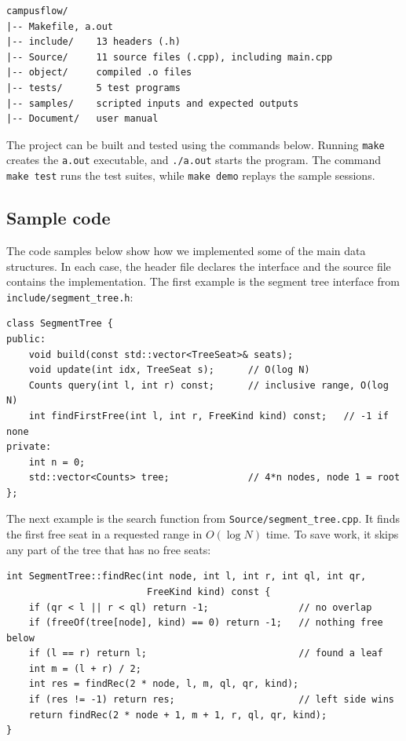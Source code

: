 \documentclass[11pt,a4paper]{article}
\newcommand{\code}[1]{\texttt{#1}}
\begin{document}
\begin{lstlisting}[language={}, caption={Directory layout of the submission.}]
campusflow/
|-- Makefile, a.out
|-- include/    13 headers (.h)
|-- Source/     11 source files (.cpp), including main.cpp
|-- object/     compiled .o files
|-- tests/      5 test programs
|-- samples/    scripted inputs and expected outputs
|-- Document/   user manual
\end{lstlisting}

The project can be built and tested using the commands below. Running
\code{make} creates the \code{a.out} executable, and \code{./a.out} starts the
program. The command \code{make test} runs the test suites, while
\code{make demo} replays the sample sessions.

\subsection{Sample code}
The code samples below show how we implemented some of the main data
structures. In each case, the header file declares the interface and the source
file contains the implementation. The first example is the segment tree
interface from \code{include/segment\_tree.h}:

\begin{lstlisting}[caption={Segment tree interface (excerpt).}]
class SegmentTree {
public:
    void build(const std::vector<TreeSeat>& seats);
    void update(int idx, TreeSeat s);      // O(log N)
    Counts query(int l, int r) const;      // inclusive range, O(log N)
    int findFirstFree(int l, int r, FreeKind kind) const;   // -1 if none
private:
    int n = 0;
    std::vector<Counts> tree;              // 4*n nodes, node 1 = root
};
\end{lstlisting}

The next example is the search function from
\code{Source/segment\_tree.cpp}. It finds the first free seat in a requested
range in $O(\log N)$ time. To save work, it skips any part of the tree that has
no free seats:

\begin{lstlisting}[caption={Finding the first free seat in a range.}]
int SegmentTree::findRec(int node, int l, int r, int ql, int qr,
                         FreeKind kind) const {
    if (qr < l || r < ql) return -1;                // no overlap
    if (freeOf(tree[node], kind) == 0) return -1;   // nothing free below
    if (l == r) return l;                           // found a leaf
    int m = (l + r) / 2;
    int res = findRec(2 * node, l, m, ql, qr, kind);
    if (res != -1) return res;                      // left side wins
    return findRec(2 * node + 1, m + 1, r, ql, qr, kind);
}
\end{lstlisting}
\end{document}

